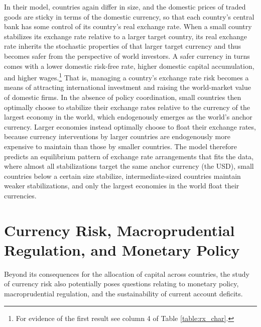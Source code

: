 \documentclass{ar-1col}
\begin{document}
In their model, countries again differ in size, and the domestic prices of traded goods are sticky in terms of the domestic currency, so that each country's central bank has some control of its country's real exchange rate. When a small country stabilizes its exchange rate relative to a larger target country, its real exchange rate inherits the stochastic properties of that larger target currency and thus becomes safer from the perspective of world investors. A safer currency in turns comes with a lower domestic risk-free rate, higher domestic capital accumulation, and higher wages.\footnote{For evidence of the first result see column 4 of Table \ref{table:rx_char}.}  That is, managing a country's exchange rate risk becomes a means of attracting international investment and raising the world-market value of domestic firms. In the absence of policy coordination, small countries then optimally choose to stabilize their exchange rates relative to the currency of the largest economy in the world, which endogenously emerges as the world's anchor currency. Larger economies instead optimally choose to float their exchange rates, because currency interventions by larger countries are endogenously more expensive to maintain than those by smaller countries. The model therefore predicts an equilibrium pattern of exchange rate arrangements that fits the data, where almost all stabilizations target the same anchor currency (the USD), small countries below a certain size stabilize, intermediate-sized countries maintain weaker stabilizations, and only the largest economies in the world float their currencies. 

\section{Currency Risk, Macroprudential Regulation, and Monetary Policy \label{sec_balancesheets}}

Beyond its consequences for the allocation of capital across countries, the study of currency risk also potentially poses questions relating to monetary policy, macroprudential regulation, and the sustainability of current account deficits.
\end{document}
